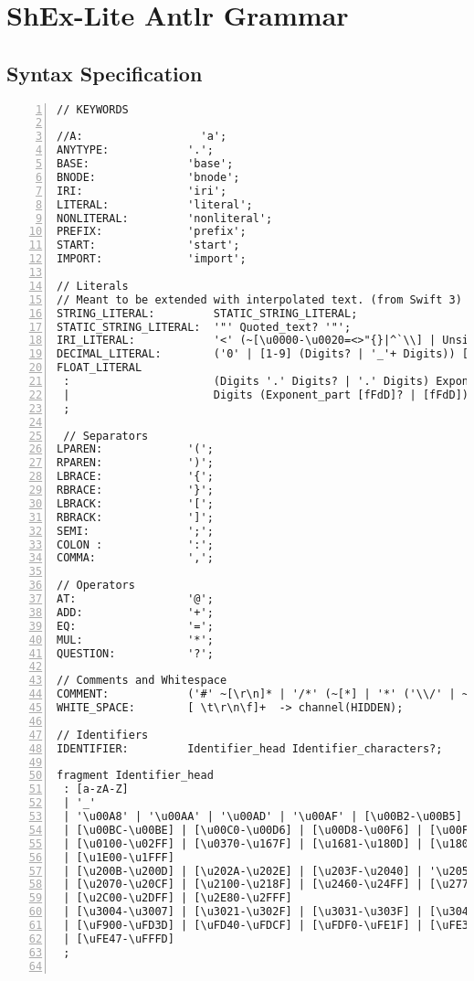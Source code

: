 \chapter{ShEx-Lite Antlr Grammar}
\section{Syntax Specification}
\begin{lstlisting}[numbers=left,basicstyle=\ttfamily\scriptsize]
// KEYWORDS

//A:                  'a';
ANYTYPE:            '.';
BASE:               'base';
BNODE:              'bnode';
IRI:                'iri';
LITERAL:		    'literal';
NONLITERAL:         'nonliteral';
PREFIX:             'prefix';
START:              'start';
IMPORT:             'import';
    
// Literals
// Meant to be extended with interpolated text. (from Swift 3)
STRING_LITERAL:         STATIC_STRING_LITERAL;
STATIC_STRING_LITERAL:  '"' Quoted_text? '"';
IRI_LITERAL:            '<' (~[\u0000-\u0020=<>"{}|^`\\] | Unsigned_character)* '>';
DECIMAL_LITERAL:        ('0' | [1-9] (Digits? | '_'+ Digits)) [lL]?;
FLOAT_LITERAL
 :                      (Digits '.' Digits? | '.' Digits) Exponent_part? [fFdD]?
 |                      Digits (Exponent_part [fFdD]? | [fFdD])
 ;

 // Separators
LPAREN:             '(';
RPAREN:             ')';
LBRACE:             '{';
RBRACE:             '}';
LBRACK:             '[';
RBRACK:             ']';
SEMI:               ';';
COLON :             ':';
COMMA:              ',';

// Operators
AT:                 '@';
ADD:                '+';
EQ:                 '=';
MUL:                '*';
QUESTION:           '?';

// Comments and Whitespace
COMMENT:            ('#' ~[\r\n]* | '/*' (~[*] | '*' ('\\/' | ~[/]))* '*/') -> channel(HIDDEN);
WHITE_SPACE:        [ \t\r\n\f]+  -> channel(HIDDEN);

// Identifiers
IDENTIFIER:         Identifier_head Identifier_characters?;

fragment Identifier_head
 : [a-zA-Z]
 | '_'
 | '\u00A8' | '\u00AA' | '\u00AD' | '\u00AF' | [\u00B2-\u00B5] | [\u00B7-\u00BA]
 | [\u00BC-\u00BE] | [\u00C0-\u00D6] | [\u00D8-\u00F6] | [\u00F8-\u00FF]
 | [\u0100-\u02FF] | [\u0370-\u167F] | [\u1681-\u180D] | [\u180F-\u1DBF]
 | [\u1E00-\u1FFF]
 | [\u200B-\u200D] | [\u202A-\u202E] | [\u203F-\u2040] | '\u2054' | [\u2060-\u206F]
 | [\u2070-\u20CF] | [\u2100-\u218F] | [\u2460-\u24FF] | [\u2776-\u2793]
 | [\u2C00-\u2DFF] | [\u2E80-\u2FFF]
 | [\u3004-\u3007] | [\u3021-\u302F] | [\u3031-\u303F] | [\u3040-\uD7FF]
 | [\uF900-\uFD3D] | [\uFD40-\uFDCF] | [\uFDF0-\uFE1F] | [\uFE30-\uFE44]
 | [\uFE47-\uFFFD]
 ;


\end{lstlisting}
